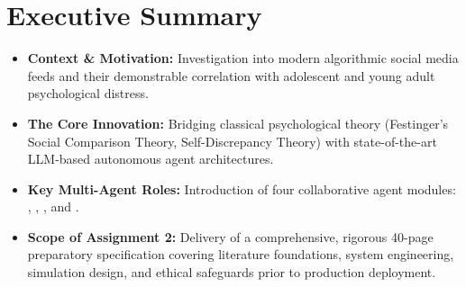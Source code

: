 \section*{Executive Summary}
\begin{itemize}
    \item \textbf{Context \& Motivation:} Investigation into modern algorithmic social media feeds and their demonstrable correlation with adolescent and young adult psychological distress.
    \item \textbf{The Core Innovation:} Bridging classical psychological theory (Festinger's Social Comparison Theory, Self-Discrepancy Theory) with state-of-the-art LLM-based autonomous agent architectures.
    \item \textbf{Key Multi-Agent Roles:} Introduction of four collaborative agent modules: \agentObserver, \agentAnalyst, \agentReflector, and \agentInterventionist.
    \item \textbf{Scope of Assignment 2:} Delivery of a comprehensive, rigorous 40-page preparatory specification covering literature foundations, system engineering, simulation design, and ethical safeguards prior to production deployment.
\end{itemize}
